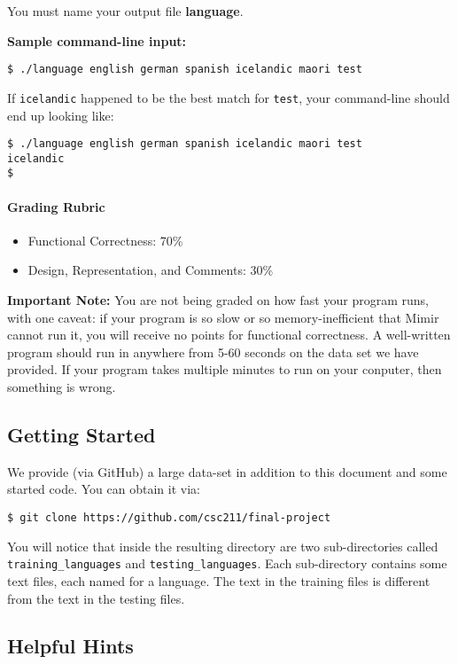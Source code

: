 \documentclass[]{article}
\providecommand{\tightlist}{%
  \setlength{\itemsep}{0pt}\setlength{\parskip}{0pt}}
\let\oldparagraph\paragraph
\renewcommand{\paragraph}[1]{\oldparagraph{#1}\mbox{}}
\begin{document}
You must name your output file \textbf{language}.

\textbf{Sample command-line input:}

\texttt{\$ ./language english german spanish icelandic maori test}

If \texttt{icelandic} happened to be the best match for \texttt{test},
your command-line should end up looking like:

\texttt{\$ ./language english german spanish icelandic maori test}\\
\texttt{icelandic}\\
\texttt{\$ }

\paragraph{Grading Rubric}\label{grading-rubric-1}

\begin{itemize}
\tightlist
\item
  Functional Correctness: 70\%
\item
  Design, Representation, and Comments: 30\%
\end{itemize}

\textbf{Important Note:} You are not being graded on how fast your
program runs, with one caveat: if your program is so slow or so
memory-inefficient that Mimir cannot run it, you will receive no points
for functional correctness. A well-written program should run in
anywhere from 5-60 seconds on the data set we have provided. If your
program takes multiple minutes to run on your conputer, then something
is wrong.

\subsection{Getting Started}\label{getting-started}

We provide (via GitHub) a large data-set in addition to this document
and some started code. You can obtain it via:

\texttt{\$ git clone https://github.com/csc211/final-project}

You will notice that inside the resulting directory are two
sub-directories called \texttt{training\_languages} and
\texttt{testing\_languages}. Each sub-directory contains some text
files, each named for a language. The text in the training files is
different from the text in the testing files.

\subsection{Helpful Hints}\label{helpful-hints}
\end{document}
